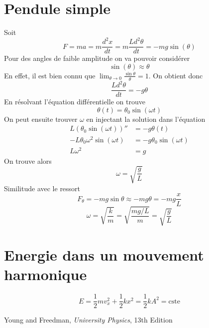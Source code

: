 \section{Pendule simple}
Soit
\[ F = ma = m\frac{d^2x}{dt} = m\frac{Ld^2\theta}{dt} = -mg\sin{(\theta )} \]
Pour des angles de faible amplitude on va pouvoir considérer
\[ \sin(\theta) \approx \theta \]
En effet, il est bien connu que
$\lim_{\theta \to 0} \frac{\sin\theta}{\theta} = 1$.
On obtient donc
\[ \frac{Ld^2\theta}{dt} = -g\theta \]
En résolvant l'équation différentielle on trouve
\[ \theta{(t)} = \theta_0\sin{(\omega{t})} \]
On peut ensuite trouver $\omega$ en injectant la solution dans l'équation
\begin{align*}
  L(\theta_0\sin{(\omega{t})})'' & = -g\theta{(t)}\\
  -L\theta_0\omega^2\sin{(\omega{t})} & = -g\theta_0\sin{(\omega{t})}\\
  L\omega^2 & = g
\end{align*}
On trouve alors
\[ \omega = \sqrt{\frac{g}{L}} \]
Similitude avec le ressort
\[ F_{\theta} = -mg\sin\theta \approx -mg\theta = -mg\frac{x}{L} \]
\[ \omega =\sqrt{\frac{k}{m}} =\sqrt{\frac{mg/L}{m}} = \sqrt{\frac{g }{L}} \]

\section{Energie dans un mouvement harmonique}
\[ E = \frac{1}{2}mv^2_x + \frac{1}{2}kx^2 = \frac{1}{2}kA^2 = \mathrm{cste} \]

\begin{thebibliography}{9}
    Young and Freedman,
    \emph{University Physics},
    13th Edition
\end{thebibliography}


